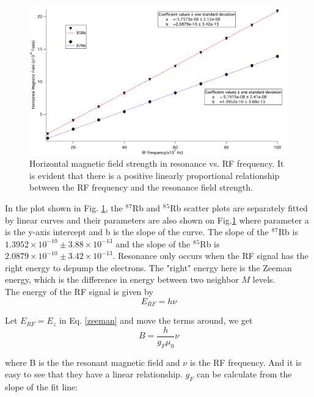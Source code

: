 \documentclass[prb,preprint]{revtex4-1}
\begin{document}
\begin{figure}[h]
\centering
\includegraphics[width=16cm]{slopegraph.png}
\caption{Horizontal magnetic field strength in resonance vs. RF frequency. It is evident that there is a positive linearly proportional relationship between the RF frequency and the resonance field strength. }
\label{both}
\end{figure}

In the plot shown in Fig. \ref{both}, the $^8$$^7$Rb and $^8$$^5$Rb scatter plots are separately fitted by linear curves and their parameters are also shown on Fig.\ref{both} where parameter a is the y-axis intercept and b is the slope of the curve. The slope of the $^8$$^7$Rb is $1.3952\times 10^{-10} \pm 3.88 \times 10^{-13}$ and the slope of the $^8$$^5$Rb is $2.0879 \times 10^{-10} \pm 3.42 \times 10^{-13}$. Resonance only occurs when the RF signal has the right energy to depump the electrons. The "right" energy here is the Zeeman energy, which is the difference in energy between two neighbor $M$ levels. \\

The energy of the RF signal is given by
\begin{equation}
E_{RF}=h\nu
\label{rfenergy}
\end{equation}

Let $E_{RF}=E_{z}$ in Eq. \ref{zeeman} and move the terms around, we get
\begin{equation}
B=\frac{h}{g_{F}\mu_{0}}\nu
\label{bandf}
\end{equation}

where B is the the resonant magnetic field and $\nu$ is the RF frequency. And it is easy to see that they have a linear relationship. $g_{F}$ can be calculate from the slope of the fit line:
\end{document}
